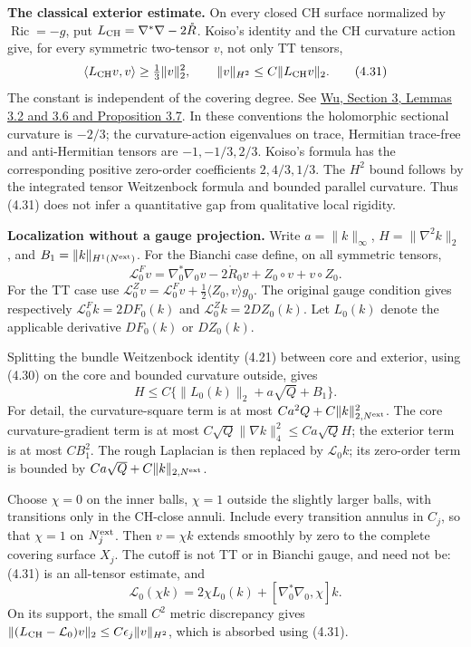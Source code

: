 \documentclass[
  10pt,
]{article}
\begin{document}
\textbf{The classical exterior estimate.} On every closed CH surface
normalized by \(\operatorname{Ric}=-g\), put
\(L_{\rm CH}=\nabla^*\nabla-2\mathring R\). Koiso's identity and the CH
curvature action give, for every symmetric two-tensor \(v\), not only TT
tensors, \[
 \langle L_{\rm CH}v,v\rangle\ge\tfrac13\|v\|_2^2,\qquad
 \|v\|_{H^2}\le C\|L_{\rm CH}v\|_2. \tag{4.31}
\] The constant is independent of the covering degree. See
\href{https://arxiv.org/abs/1106.0511}{Wu, Section 3, Lemmas 3.2 and 3.6
and Proposition 3.7}. In these conventions the holomorphic sectional
curvature is \(-2/3\); the curvature-action eigenvalues on trace,
Hermitian trace-free and anti-Hermitian tensors are \(-1,-1/3,2/3\).
Koiso's formula has the corresponding positive zero-order coefficients
\(2,4/3,1/3\). The \(H^2\) bound follows by the integrated tensor
Weitzenbock formula and bounded parallel curvature. Thus (4.31) does not
infer a quantitative gap from qualitative local rigidity.

\textbf{Localization without a gauge projection.} Write
\(a=\|k\|_\infty\), \(H=\|\nabla^2k\|_2\), and
\(B_1=\|k\|_{H^1(N^{\rm ext})}\). For the Bianchi case define, on all
symmetric tensors, \[
 \mathcal L_0^F v=\nabla_0^*\nabla_0v
          -2\mathring R_0v+Z_0\circ v+v\circ Z_0.
\] For the TT case use
\(\mathcal L_0^Z v=\mathcal L_0^Fv+ \frac12\langle Z_0,v\rangle g_0\).
The original gauge condition gives respectively
\(\mathcal L_0^Fk=2DF_0(k)\) and \(\mathcal L_0^Zk=2DZ_0(k)\). Let
\(L_0(k)\) denote the applicable derivative \(DF_0(k)\) or \(DZ_0(k)\).

Splitting the bundle Weitzenbock identity (4.21) between core and
exterior, using (4.30) on the core and bounded curvature outside, gives
\[
 H\le C\{\|L_0(k)\|_2+a\sqrt Q+B_1\}. \tag{4.32}
\] For detail, the curvature-square term is at most
\(Ca^2Q+C\|k\|_{2,N^{\rm ext}}^2\). The core curvature-gradient term is
at most \(C\sqrt Q\|\nabla k\|_4^2\le Ca\sqrt Q H\); the exterior term
is at most \(C B_1^2\). The rough Laplacian is then replaced by
\(\mathcal L_0k\); its zero-order term is bounded by
\(Ca\sqrt Q+C\|k\|_{2,N^{\rm ext}}\).

Choose \(\chi=0\) on the inner balls, \(\chi=1\) outside the slightly
larger balls, with transitions only in the CH-close annuli. Include
every transition annulus in \(C_j\), so that \(\chi=1\) on
\(N_j^{\rm ext}\). Then \(v=\chi k\) extends smoothly by zero to the
complete covering surface \(X_j\). The cutoff is not TT or in Bianchi
gauge, and need not be: (4.31) is an all-tensor estimate, and \[
 \mathcal L_0(\chi k)=2\chi L_0(k)
                   +[\nabla_0^*\nabla_0,\chi]k. \tag{4.33}
\] On its support, the small \(C^2\) metric discrepancy gives
\(\|(L_{\rm CH}-\mathcal L_0)v\|_2 \le C\epsilon_j\|v\|_{H^2}\), which
is absorbed using (4.31).
\end{document}
